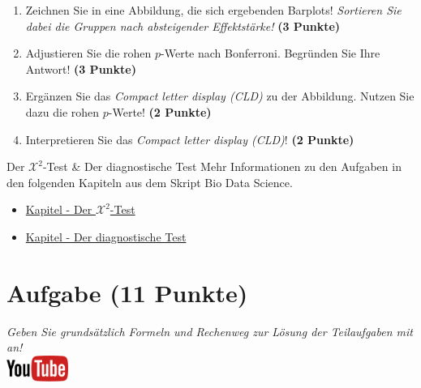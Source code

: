 \documentclass[a4paper, 9pt]{scrartcl}\usepackage[]{graphicx}\usepackage[]{xcolor}
\begin{document}
\begin{enumerate}
\item Zeichnen Sie in eine Abbildung, die sich ergebenden Barplots! \textit{Sortieren Sie dabei die Gruppen nach absteigender Effektstärke!} \textbf{(3 Punkte)}
\item Adjustieren Sie die rohen $p$-Werte nach Bonferroni. Begr{\"u}nden Sie Ihre Antwort! \textbf{(3 Punkte)}
\item Erg{\"a}nzen Sie das \textit{Compact letter display (CLD)} zu der
  Abbildung. Nutzen Sie dazu die rohen $p$-Werte! \textbf{(2 Punkte)}
\item Interpretieren Sie das \textit{Compact letter display (CLD)}! \textbf{(2 Punkte)} 
\end{enumerate}

 
\clearpage
  \begin{graybox}{Der $\mathcal{X}^2$-Test \& Der diagnostische Test}
Mehr Informationen zu den Aufgaben in den folgenden Kapiteln aus dem Skript Bio Data Science.
  \begin{itemize}
  \item \href{https://jkruppa.github.io/stat-tests-chi-test.html}{Kapitel - Der $\mathcal{X}^2$-Test}
  \item \href{https://jkruppa.github.io/stat-tests-diagnostic.html}{Kapitel - Der diagnostische Test}
  \end{itemize}
\end{graybox}
\clearpage

\section{Aufgabe \hfill (11 Punkte)}

\textit{Geben Sie grunds{\"a}tzlich Formeln und Rechenweg zur L{\"o}sung der
  Teilaufgaben mit an!} \\[1Ex]

\hfill\href{https://youtu.be/-Kva5wc5Elw}{\includegraphics[width =
  2cm]{img/youtube}}\\[1Ex]
\end{document}
